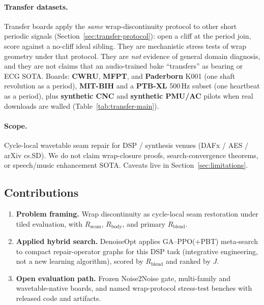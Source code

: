 \paragraph{Transfer datasets.}
Transfer boards apply the \emph{same} wrap-discontinuity protocol to other short periodic signals
(Section~\ref{sec:transfer-protocol}): open a cliff at the period join, score against a no-cliff ideal sibling.
They are mechanistic stress tests of wrap geometry under that protocol.
They are \emph{not} evidence of general domain diagnosis, and they are not claims that an audio-trained bake ``transfers'' as bearing or ECG SOTA.
Boards: \textbf{CWRU}, \textbf{MFPT}, and \textbf{Paderborn} K001 (one shaft revolution as a period),
\textbf{MIT-BIH} and a \textbf{PTB-XL} 500\,Hz subset (one heartbeat as a period),
plus \textbf{synthetic CNC} and \textbf{synthetic PMU/AC} pilots when real downloads are walled
(Table~\ref{tab:transfer-main}).

\paragraph{Scope.}
Cycle-local wavetable seam repair for DSP / synthesis venues (DAFx / AES / arXiv cs.SD).
We do not claim wrap-closure proofs, search-convergence theorems, or speech/music enhancement SOTA.
Caveats live in Section~\ref{sec:limitations}.

\subsection{Contributions}
\label{sec:contributions}
\begin{enumerate}
  \item \textbf{Problem framing.} Wrap discontinuity as cycle-local seam restoration under tiled evaluation, with $R_{\mathrm{seam}}$, $R_{\mathrm{body}}$, and primary $R_{\mathrm{blend}}$.
  \item \textbf{Applied hybrid search.} DenoiseOpt applies GA--PPO(+PBT) meta-search to compact repair-operator graphs for this DSP task (integrative engineering, not a new learning algorithm), scored by $R_{\mathrm{blend}}$ and ranked by $J$.
  \item \textbf{Open evaluation path.} Frozen Noise2Noise gate, multi-family and wavetable-native boards, and named wrap-protocol stress-test benches with released code and artifacts.
\end{enumerate}
